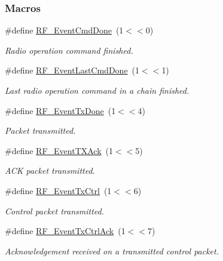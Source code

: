 \subsubsection*{Macros}
\begin{DoxyCompactItemize}
\item 
\#define \hyperlink{group___r_f___core___events_gaa1534b443f03187f07f55b0198306a27}{R\+F\+\_\+\+Event\+Cmd\+Done}~(1$<$$<$0)
\begin{DoxyCompactList}\small\item\em Radio operation command finished. \end{DoxyCompactList}\item 
\#define \hyperlink{group___r_f___core___events_ga2d60db886271cf8e08c7b6b2f5e534f1}{R\+F\+\_\+\+Event\+Last\+Cmd\+Done}~(1$<$$<$1)
\begin{DoxyCompactList}\small\item\em Last radio operation command in a chain finished. \end{DoxyCompactList}\item 
\#define \hyperlink{group___r_f___core___events_ga4e8f8b70a9cd745561251d61940880f6}{R\+F\+\_\+\+Event\+Tx\+Done}~(1$<$$<$4)
\begin{DoxyCompactList}\small\item\em Packet transmitted. \end{DoxyCompactList}\item 
\#define \hyperlink{group___r_f___core___events_gab1ab01acc148654e8b3dfe42d64785b1}{R\+F\+\_\+\+Event\+T\+X\+Ack}~(1$<$$<$5)
\begin{DoxyCompactList}\small\item\em A\+C\+K packet transmitted. \end{DoxyCompactList}\item 
\#define \hyperlink{group___r_f___core___events_ga8421bd3a69743f088ac534f85b099a8d}{R\+F\+\_\+\+Event\+Tx\+Ctrl}~(1$<$$<$6)
\begin{DoxyCompactList}\small\item\em Control packet transmitted. \end{DoxyCompactList}\item 
\#define \hyperlink{group___r_f___core___events_gaf15e72a260f7c2d3d659ad76cb876f9a}{R\+F\+\_\+\+Event\+Tx\+Ctrl\+Ack}~(1$<$$<$7)
\begin{DoxyCompactList}\small\item\em Acknowledgement received on a transmitted control packet. \end{DoxyCompactList}\item 

\end{DoxyCompactItemize}
